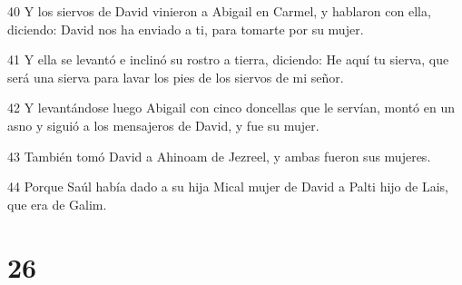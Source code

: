 \par 40 Y los siervos de David vinieron a Abigail en Carmel, y hablaron con ella, diciendo: David nos ha enviado a ti, para tomarte por su mujer.
\par 41 Y ella se levantó e inclinó su rostro a tierra, diciendo: He aquí tu sierva, que será una sierva para lavar los pies de los siervos de mi señor.
\par 42 Y levantándose luego Abigail con cinco doncellas que le servían, montó en un asno y siguió a los mensajeros de David, y fue su mujer.
\par 43 También tomó David a Ahinoam de Jezreel, y ambas fueron sus mujeres.
\par 44 Porque Saúl había dado a su hija Mical mujer de David a Palti hijo de Lais, que era de Galim.

\chapter{26}

